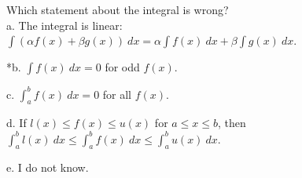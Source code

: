 
Which statement about the integral is wrong?\\

a. The integral is linear:
\( \int ( \alpha f ( x ) + \beta g ( x ) )\ dx = \alpha\int f ( x )\ dx + \beta\int g ( x ) \ dx \).

*b. \( \int f ( x )\ dx = 0\) for odd \( f(x) \).

c. \( \int_a^b f ( x )\ dx = 0 \) for all \( f(x) \).

d. If \( l ( x ) \leq f ( x ) \leq u(x) \) for
\( a \leq x \leq b \), then
\( \int_a^b l ( x ) \ dx \leq \int_a^b f ( x ) \ dx \leq \int_a^b u ( x ) \ dx\).

e. I do not know.\\
